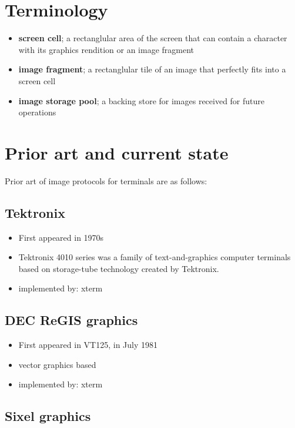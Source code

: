 \documentclass[a4paper]{article}
\begin{document}
\section{Terminology} %
\begin{itemize}
    \item \textbf{screen cell}; a rectanglular area of the screen that can contain a character with
        its graphics rendition or an image fragment
    \item \textbf{image fragment}; a rectanglular tile of an image that perfectly fits into a screen cell
    \item \textbf{image storage pool}; a backing store for images received for future operations
\end{itemize}


\section{Prior art and current state} %

Prior art of image protocols for terminals are as follows:

\subsection{Tektronix}

\begin{itemize}
    \item First appeared in 1970s
    \item Tektronix 4010 series was a family of text-and-graphics computer terminals based on storage-tube technology created by Tektronix.
    \item implemented by: xterm
\end{itemize}

\subsection{DEC ReGIS graphics}

\begin{itemize}
    \item First appeared in VT125, in July 1981
    \item vector graphics based
    \item implemented by: xterm
\end{itemize}

\subsection{Sixel graphics}
\end{document}
